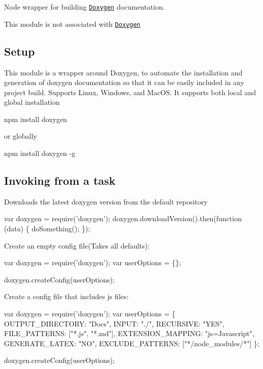 \href{https://www.npmjs.org/package/doxygen}{\tt } \href{https://travis-ci.org/EruantalonJS/node-doxygen}{\tt } \href{https://codeclimate.com/github/EruantalonJS/node-doxygen}{\tt }

Node wrapper for building \href{https://www.doxygen.org}{\tt Doxygen} documentation.

This module is not associated with \href{https://www.doxygen.org}{\tt Doxygen} \subsection*{Setup}

This module is a wrapper around Doxygen, to automate the installation and generation of doxygen documentation so that it can be easily included in any project build. Supports Linux, Windows, and Mac\+OS. It supports both local and global installation

{\ttfamily npm install doxygen}

or globally

{\ttfamily npm install doxygen -\/g}

\subsection*{Invoking from a task}

Downloads the latest doxygen version from the default repository


\begin{DoxyCode}
var doxygen = require('doxygen');
doxygen.downloadVersion().then(function (data) \{
        doSomething();
\});
\end{DoxyCode}


Create an empty config file(\+Takes all defaults)\+:


\begin{DoxyCode}
var doxygen = require('doxygen');
var userOptions = \{\};

doxygen.createConfig(userOptions);
\end{DoxyCode}


Create a config file that includes js files\+:


\begin{DoxyCode}
var doxygen = require('doxygen');
var userOptions = \{
    OUTPUT\_DIRECTORY: "Docs",
    INPUT: "./",
    RECURSIVE: "YES",
    FILE\_PATTERNS: ["*.js", "*.md"],
    EXTENSION\_MAPPING: "js=Javascript",
    GENERATE\_LATEX: "NO",
    EXCLUDE\_PATTERNS: ["*/node\_modules/*"]
\};

doxygen.createConfig(userOptions);
\end{DoxyCode}


